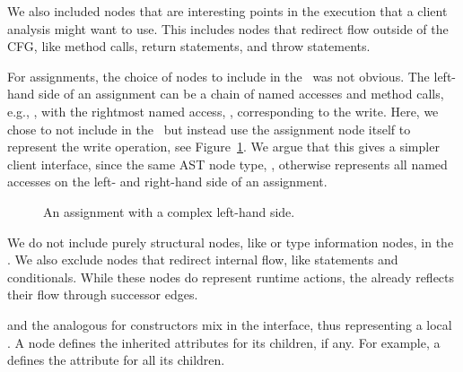 We also included nodes that are interesting points in the execution that a client analysis might want to use.
This includes nodes that redirect flow outside of the CFG, like method calls, return statements, and throw statements.

For assignments, the choice of nodes to include in the \CFG\ was not obvious.
The left-hand side of an assignment can be a chain of named accesses and method calls, e.g., , with the rightmost named access, , corresponding to the write.
Here, we chose to not include  in the \CFG\, but instead use the assignment node itself
to represent the write operation, see Figure~\ref{fig:AssigExpr}.
We argue that this gives a simpler client interface, since the same AST node type, , otherwise represents all named accesses on the left- and right-hand side of an assignment.

\begin{figure}
   \scalebox{0.60}{
     
     }
     \caption{An assignment with a complex left-hand side.
}
	\label{fig:AssigExpr}
\end{figure}

We do not include purely structural nodes, like  or type information nodes, in the {\CFG}.
We also exclude
nodes that redirect internal flow, like  statements and conditionals.
While these nodes do represent runtime actions, the {\CFG} already reflects their flow through successor edges.


 and the analogous  for constructors mix in the  interface, thus representing a local \CFG.
A  node defines the inherited attributes for its  children, if any.
For example, a  defines the  attribute for all its children.


